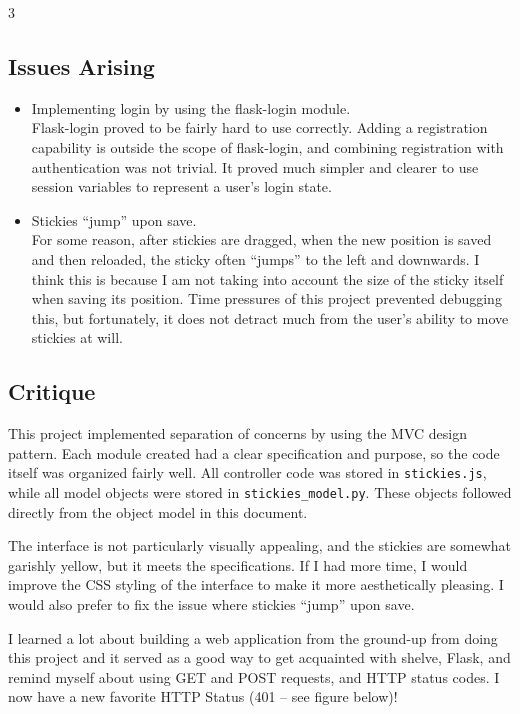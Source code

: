 3\documentclass[11pt,letterpaper]{article}
\begin{document}
\subsection{Issues Arising}
\begin{itemize}
\item Implementing login by using the flask-login module. \\
Flask-login proved to be fairly hard to use correctly. Adding a registration capability is outside the scope of flask-login, and combining registration with authentication was not trivial. It proved much simpler and clearer to use session variables to represent a user's login state.
\item Stickies ``jump'' upon save.\\
For some reason, after stickies are dragged, when the new position is saved and then reloaded, the sticky often ``jumps'' to the left and downwards. I think this is because I am not taking into account the size of the sticky itself when saving its position. Time pressures of this project prevented debugging this, but fortunately, it does not detract much from the user's ability to move stickies at will.
\end{itemize}

\subsection{Critique}
This project implemented separation of concerns by using the MVC design pattern. Each module created had a clear specification and purpose, so the code itself was organized fairly well. All controller code was stored in \texttt{stickies.js}, while all model objects were stored in \texttt{stickies\_model.py}. These objects followed directly from the object model in this document.

The interface is not particularly visually appealing, and the stickies are somewhat garishly yellow, but it meets the specifications. If I had more time, I would improve the CSS styling of the interface to make it more aesthetically pleasing. I would also prefer to fix the issue where stickies ``jump'' upon save.

I learned a lot about building a web application from the ground-up from doing this project and it served as a good way to get acquainted with shelve, Flask, and remind myself about using GET and POST requests, and HTTP status codes. I now have a new favorite HTTP Status (401 -- see figure below)!
\end{document}
